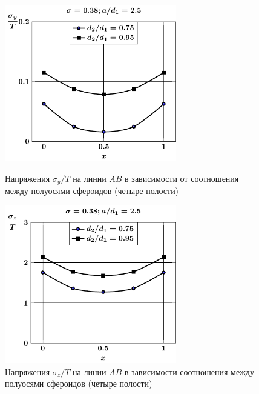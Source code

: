 %

\begin{figure}[h!]
\centering\footnotesize
\parbox[b]{7.5cm}{\centering\includegraphics[width=7.5cm]{cav4-d-sig_y.pdf}
\caption{Напряжения $\sigma_y/T$ на линии $AB$ в зависимости от соотношения между полуосями сфероидов (четыре полости)
\label{f:9:6}}}\hfil\hfil
\parbox[b]{7.5cm}{\centering\includegraphics[width=7.5cm]{cav4-d-sig_z.pdf}
\caption{Напряжения $\sigma_z/T$ на линии $AB$ в зависимости соотношения между полуосями сфероидов (четыре полости)
\label{f:9:7}}}
\end{figure}

